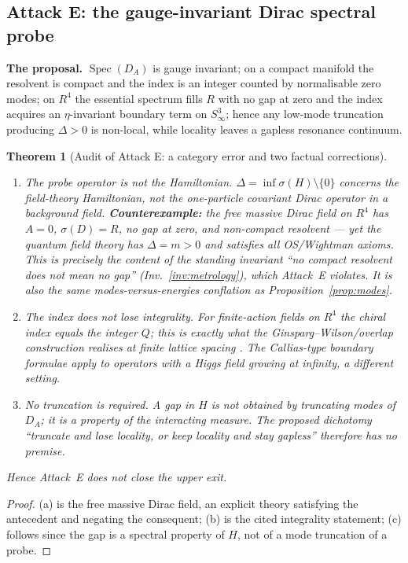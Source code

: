 \documentclass[11pt,a4paper]{article}
\def\R{R}\def\N{N}\def\Q{Q}\def\Z{Z}\def\Class{C}\def\OS{OS}\def\Gap{Gap}%
\theoremstyle{plain}
\newtheorem{theorem}{Theorem}[section]
\theoremstyle{definition}
\theoremstyle{remark}
\newcommand{\R}{\mathbb{R}}\newcommand{\N}{\mathbb{N}}\newcommand{\Q}{\mathbb{Q}}
\newcommand{\Z}{\mathbb{Z}}\newcommand{\Spec}{\operatorname{Spec}}
\newcommand{\OS}{\mathrm{OS}}\newcommand{\Gap}{\mathrm{Gap}}
\newcommand{\Class}{\mathcal{C}}\newcommand{\Htot}{\mathcal{H}}
\renewcommand{\_}{\oldunderscore\allowbreak}
\begin{document}
\subsection{Attack E: the gauge-invariant Dirac spectral probe}
\textbf{The proposal.} $\Spec(D_A)$ is gauge invariant; on a compact manifold the resolvent is
compact and the index is an integer counted by normalisable zero modes; on $\R^4$ the essential
spectrum fills $\R$ with no gap at zero and the index acquires an $\eta$-invariant boundary term
on $S^3_\infty$; hence any low-mode truncation producing $\Delta>0$ is non-local, while locality
leaves a gapless resonance continuum.
\begin{theorem}[Audit of Attack E: a category error and two factual corrections]
\label{thm:attackE}
\begin{enumerate}[label=(\alph*),leftmargin=22pt,itemsep=2pt]
\item \emph{The probe operator is not the Hamiltonian.} $\Delta=\inf\sigma(H)\setminus\{0\}$
concerns the \emph{field-theory Hamiltonian}, not the one-particle covariant Dirac operator in a
background field. \textbf{Counterexample:} the free \emph{massive Dirac field} on $\R^4$ has
$A=0$, $\sigma(D)=\R$, no gap at zero, and non-compact resolvent --- yet the quantum field theory
has $\Delta=m>0$ and satisfies all OS/Wightman axioms. This is precisely the content of the
standing invariant ``no compact resolvent does not mean no gap'' (Inv.~\ref{inv:metrology}),
which Attack~E violates. It is also the same modes-versus-energies conflation as
Proposition~\ref{prop:modes}.
\item \emph{The index does not lose integrality.} For finite-action fields on $\R^4$ the chiral
index equals the integer $Q$; this is exactly what the Ginsparg--Wilson/overlap construction
realises \emph{at finite lattice spacing} \cite{Schierholz2024}. The Callias-type boundary
formulae apply to operators with a Higgs field growing at infinity, a different setting.
\item \emph{No truncation is required.} A gap in $H$ is not obtained by truncating modes of
$D_A$; it is a property of the interacting measure. The proposed dichotomy
``truncate and lose locality, or keep locality and stay gapless'' therefore has no premise.
\end{enumerate}
Hence Attack~E does not close the upper exit.
\end{theorem}
\begin{proof}
(a) is the free massive Dirac field, an explicit theory satisfying the antecedent and negating
the consequent; (b) is the cited integrality statement; (c) follows since the gap is a spectral
property of $H$, not of a mode truncation of a probe.
\end{proof}
\end{document}
